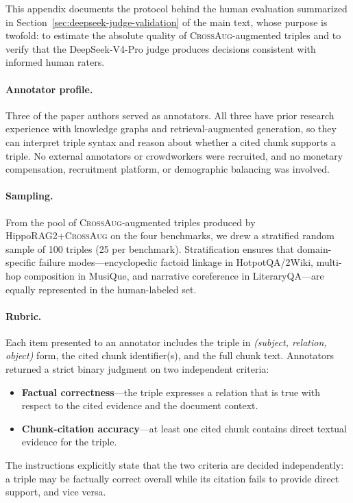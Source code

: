 \documentclass[11pt]{article}
\newcommand{\ours}{\textsc{CrossAug}\xspace}
\begin{document}
This appendix documents the protocol behind the human evaluation summarized in Section~\ref{sec:deepseek-judge-validation} of the main text, whose purpose is twofold: to estimate the absolute quality of \ours-augmented triples and to verify that the DeepSeek-V4-Pro judge produces decisions consistent with informed human raters.

\paragraph{Annotator profile.}
Three of the paper authors served as annotators. All three have prior research experience with knowledge graphs and retrieval-augmented generation, so they can interpret triple syntax and reason about whether a cited chunk supports a triple. No external annotators or crowdworkers were recruited, and no monetary compensation, recruitment platform, or demographic balancing was involved.

\paragraph{Sampling.}
From the pool of \ours-augmented triples produced by HippoRAG2+\ours on the four benchmarks, we drew a stratified random sample of 100 triples (25 per benchmark). Stratification ensures that domain-specific failure modes---encyclopedic factoid linkage in HotpotQA/2Wiki, multi-hop composition in MusiQue, and narrative coreference in LiteraryQA---are equally represented in the human-labeled set.

\paragraph{Rubric.}
Each item presented to an annotator includes the triple in \emph{(subject, relation, object)} form, the cited chunk identifier(s), and the full chunk text. Annotators returned a strict binary judgment on two independent criteria:
\begin{itemize}[noitemsep,topsep=2pt]
    \item \textbf{Factual correctness}---the triple expresses a relation that is true with respect to the cited evidence and the document context.
    \item \textbf{Chunk-citation accuracy}---at least one cited chunk contains direct textual evidence for the triple.
\end{itemize}
The instructions explicitly state that the two criteria are decided independently: a triple may be factually correct overall while its citation fails to provide direct support, and vice versa.
\end{document}
